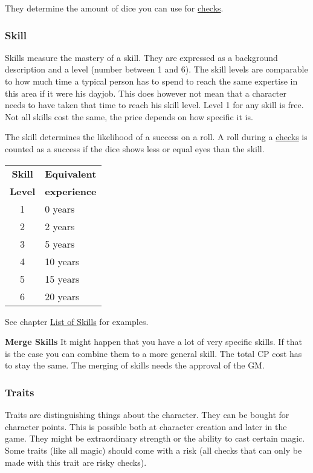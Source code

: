 \documentclass[11pt]{article}
\begin{document}
{\begin{multicols}{2}[]
They determine the amount of dice you can use for \hyperref[sec:org552c9d6]{checks}. 

\subsubsection{Skill}
\label{sec:org0f6e956}

Skills measure the mastery of a skill. They are expressed as a background description and a level (number between 1 and 6). The skill levels are comparable to how much time a typical person has to spend to reach the same expertise in this area if it were his dayjob. This does however not mean that a character needs to have taken that time to reach his skill level. Level 1 for any skill is free. Not all skills cost the same, the price depends on how specific it is.

The skill determines the likelihood of a success on a roll. A roll during a \hyperref[sec:org552c9d6]{checks} is counted as a success if the dice shows less or equal eyes than the skill.


\begin{center}
\begin{tabular}{c|l}
\textbf{Skill} & \textbf{Equivalent}\\
\textbf{Level} & \textbf{experience}\\
\hline
1 & 0 years\\
2 & 2 years\\
3 & 5 years\\
4 & 10 years\\
5 & 15 years\\
6 & 20 years\\
\end{tabular}
\end{center}

See chapter \hyperref[sec:org29cffc8]{List of Skills} for examples.

\textbf{Merge Skills}
It might happen that you have a lot of very specific skills. If that is the case you can combine them to a more general skill. The total CP cost has to stay the same. The merging of skills needs the approval of the GM.

\subsubsection{Traits}
\label{sec:orgbd56035}
Traits are distinguishing things about the character. They can be bought for character points. This is possible both at character creation and later in the game.
They might be extraordinary strength or the ability to cast certain magic. Some traits (like all magic) should come with a risk (all checks that can only be made with this trait are risky checks).


\end{multicols}}
\end{document}
